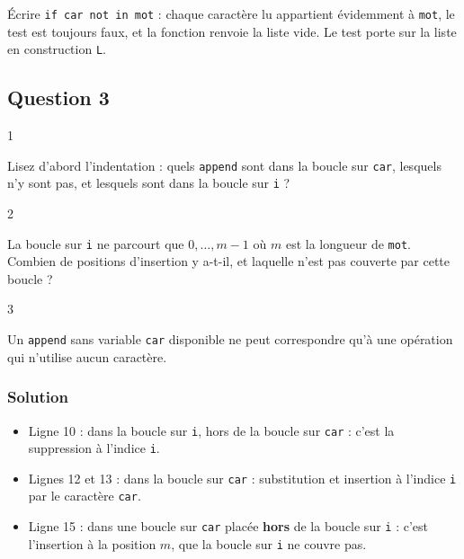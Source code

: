 \documentclass[11pt,a4paper]{article}
\providecommand{\tightlist}{\setlength{\itemsep}{0pt}\setlength{\parskip}{0pt}}
\begin{document}
\begin{piege}

Écrire \texttt{if\ car\ not\ in\ mot} : chaque caractère lu appartient évidemment à \texttt{mot}, le test est toujours faux, et la fonction renvoie la liste vide. Le test porte sur la liste en construction \texttt{L}.

\end{piege}

\hypertarget{question-3}{%
\subsection{Question 3}\label{question-3}}

\begin{indication}{1}

Lisez d'abord l'indentation : quels \texttt{append} sont dans la boucle sur \texttt{car}, lesquels n'y sont pas, et lesquels sont dans la boucle sur \texttt{i} ?

\end{indication}

\begin{indication}{2}

La boucle sur \texttt{i} ne parcourt que \(0,\dots,m-1\) où \(m\) est la longueur de \texttt{mot}. Combien de positions d'insertion y a-t-il, et laquelle n'est pas couverte par cette boucle ?

\end{indication}

\begin{indication}{3}

Un \texttt{append} sans variable \texttt{car} disponible ne peut correspondre qu'à une opération qui n'utilise aucun caractère.

\end{indication}

\hypertarget{solution-3}{%
\subsubsection{Solution}\label{solution-3}}

\begin{itemize}
\tightlist
\item
  Ligne 10 : dans la boucle sur \texttt{i}, hors de la boucle sur \texttt{car} : c'est la suppression à l'indice \texttt{i}.
\item
  Lignes 12 et 13 : dans la boucle sur \texttt{car} : substitution et insertion à l'indice \texttt{i} par le caractère \texttt{car}.
\item
  Ligne 15 : dans une boucle sur \texttt{car} placée \textbf{hors} de la boucle sur \texttt{i} : c'est l'insertion à la position \(m\), que la boucle sur \texttt{i} ne couvre pas.
\end{itemize}
\end{document}
